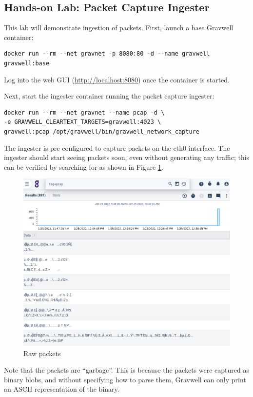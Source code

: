 \subsection{Hands-on Lab: Packet Capture Ingester}

This lab will demonstrate ingestion of packets. First, launch a base
Gravwell container:

\begin{Verbatim}[breaklines=true]
docker run --rm --net gravnet -p 8080:80 -d --name gravwell gravwell:base
\end{Verbatim}

Log into the web GUI (\href{http://localhost:8080}{http://localhost:8080}) once the container is started.

Next, start the ingester container running the packet capture
ingester:

\begin{Verbatim}[breaklines=true]
docker run --rm --net gravnet --name pcap -d \
-e GRAVWELL_CLEARTEXT_TARGETS=gravwell:4023 \
gravwell:pcap /opt/gravwell/bin/gravwell_network_capture
\end{Verbatim}


The ingester is pre-configured to capture packets on the eth0
interface. The ingester should start seeing packets soon, even without
generating any traffic; this can be verified by searching for
\code{tag=pcap} as shown in Figure \ref{fig:pcap-lab1}.

\begin{figure}
	\includegraphics[width=0.8\linewidth]{images/igst-pcap-lab1.png}
	\caption{Raw packets}
	\label{fig:pcap-lab1}
\end{figure}

Note that the packets are ``garbage''. This is because the packets were
captured as binary blobs, and without specifying how to parse them,
Gravwell can only print an ASCII representation of the binary.

